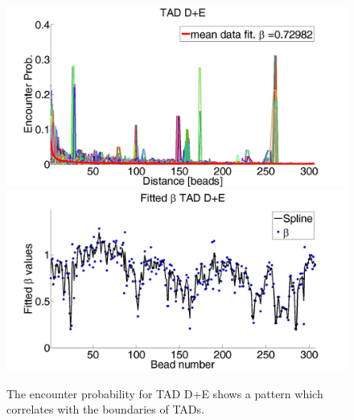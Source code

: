\documentclass[12pt]{paper}
\begin{document}
\begin{figure}[H]
\includegraphics[scale=0.3]{meanDataFitTADDAndE}
\includegraphics[scale=0.3]{fittedExpValuesWithSplineAverageTADDAndE}
\caption{The encounter probability for TAD D+E shows a pattern which correlates with the boundaries of TADs.}\label{figure_encounterProbabilityTADDAndE+fittedBeta}
\end{figure}
\end{document}
